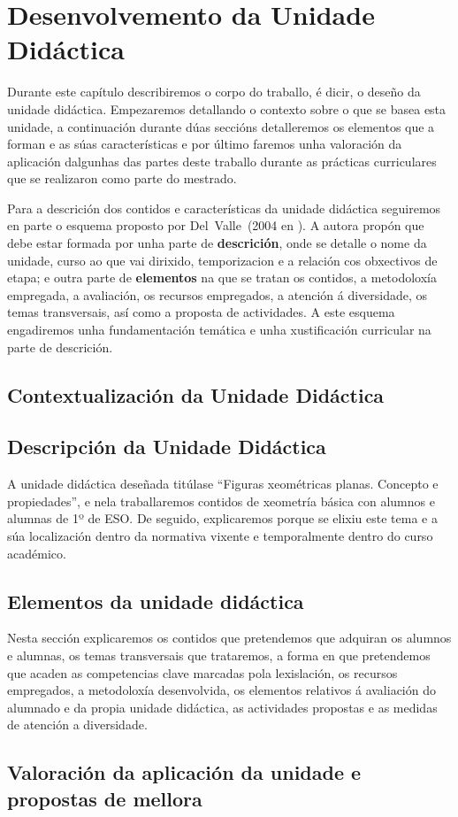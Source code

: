 \chapter{Desenvolvemento da Unidade Didáctica}\label{chap:desenvolvemento}
Durante este capítulo describiremos o corpo do traballo, é dicir, o deseño da unidade didáctica. Empezaremos detallando o contexto sobre o que se basea esta unidade, a continuación durante dúas seccións detalleremos os elementos que a forman e as súas características e por último faremos unha valoración da aplicación dalgunhas das partes deste traballo durante as prácticas curriculares que se realizaron como parte do mestrado.

Para a descrición dos contidos e características da unidade didáctica seguiremos en parte o esquema proposto por Del~Valle~(2004 en ). A autora propón que debe estar formada por unha parte de \textbf{descrición}, onde se detalle o nome da unidade, curso ao que vai dirixido, temporizacion e a relación cos obxectivos de etapa; e outra parte de \textbf{elementos} na que se tratan os contidos, a metodoloxía empregada, a avaliación, os recursos empregados, a atención á diversidade, os temas transversais, así como a proposta de actividades. A este esquema engadiremos unha fundamentación temática e unha xustificación curricular na parte de descrición.

\section{Contextualización da Unidade Didáctica}


\section{Descripción da Unidade Didáctica}
A unidade didáctica deseñada titúlase ``Figuras xeométricas planas. Concepto e propiedades'', e nela traballaremos contidos de xeometría básica con alumnos e alumnas de 1º de ESO. De seguido, explicaremos porque se elixiu este tema e a súa localización dentro da normativa vixente e temporalmente dentro do curso académico.





\section{Elementos da unidade didáctica}
Nesta sección explicaremos os contidos que pretendemos que adquiran os alumnos e alumnas, os temas transversais que trataremos, a forma en que pretendemos que acaden as competencias clave marcadas pola lexislación, os recursos empregados, a metodoloxía desenvolvida, os elementos relativos á avaliación do alumnado e da propia unidade didáctica, as actividades propostas e as medidas de atención a diversidade.









\section{Valoración da aplicación da unidade e propostas de mellora}

